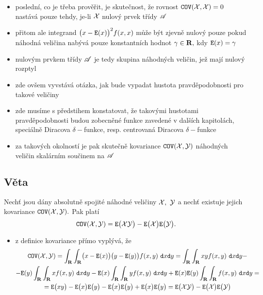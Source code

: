 \begin{itemize}
\item posledn\'i, co je t\v reba prov\v e\v rit, je skute\v cnost, \v ze rovnost $ \mathtt{COV}({\mathcal X},{\mathcal X})=0$ nast\'av\'a pouze tehdy, je-li ${\mathcal X}$ nulov\'y prvek t\v r\'idy ${\mathscr A}$
\item p\v ritom ale integrand $\bigl(x-\mathtt{E}(x)\bigr)^2f(x,x)$ m\r u\v ze b\'yt zjevn\v e nulov\'y pouze pokud n\'ahodn\'a veli\v cina nab\'yv\'a pouze konstantn\'ich hodnot $\gamma\in{\mathbf R},$ kdy $\mathtt{E}(x)=\gamma$
\item nulov\'ym prvkem t\v r\'idy ${\mathscr A}$ je tedy skupina n\'ahodn\'ych veli\v cin, je\v z maj\'i nulov\'y rozptyl
\item zde ov\v sem vyvst\'av\'a ot\'azka, jak bude vypadat hustota pravd\v epodobnosti pro takov\'e veli\v ciny
\item zde mus\'ime s p\v redstihem konstatovat, \v ze takov\'ymi hustotami pravd\v epodobnosti budou zobecn\v en\'e funkce zaveden\'e v dal\v s\'ich kapitol\'ach, speci\'aln\v e Diracova $\delta-$funkce, resp. centrovan\'a Diracova $\delta-$funkce
\item za takov\'ych okolnost\'i je pak skute\v cn\v e kovariance $\mathtt{COV}({\mathcal X},{\mathcal Y})$ n\'ahodn\'ych veli\v cin skal\'arn\'im sou\v cinem na ${\mathscr A}$


\end{itemize}



\subsection{V\v eta}\label{turner}

Nech\v t jsou d\'any absolutn\v e spojit\'e n\'ahodn\'e veli\v ciny ${\mathcal X}, ~{\mathcal Y}$ a nech\v t existuje jejich kovariance $\mathtt{COV}({\mathcal X},{\mathcal Y}).$ Pak plat\'i
%
$$\mathtt{COV}({\mathcal X},{\mathcal Y}) = \mathtt{E}\bigl({\mathcal X}{\mathcal Y}\bigr)-\mathtt{E}\bigl({\mathcal X}\bigr)\mathtt{E}\bigl({\mathcal Y}\bigr).$$

\Proof

\begin{itemize}
\item z definice kovariance p\v r\'imo vypl\'yv\'a, \v ze
%
\begin{multline*}
 \mathtt{COV}({\mathcal X},{\mathcal Y}) = \int_{\mathbf R} \int_{\mathbf R} \bigl(x-\mathtt{E}(x)\bigr)\bigl(y-\mathtt{E}(y)\bigr)f(x,y)~\mathtt{d}x\mathtt{d}y = \int_{\mathbf R}\int_{\mathbf R} xyf(x,y)~\mathtt{d}x\mathtt{d}y {}-\\
  - \mathtt{E}(y) \int_{\mathbf R}\int_{\mathbf R} xf(x,y)~\mathtt{d}x\mathtt{d}y - \mathtt{E}(x) \int_{\mathbf R}\int_{\mathbf R} yf(x,y)~\mathtt{d}x\mathtt{d}y  + \mathtt{E}(x)\mathtt{E}(y) \int_{\mathbf R}\int_{\mathbf R} f(x,y)~\mathtt{d}x\mathtt{d}y {}=\\
  = \mathtt{E}\bigl(xy\bigr) - \mathtt{E}\bigl(x\bigr)\mathtt{E}\bigl(y\bigr) - \mathtt{E}\bigl(x\bigr)\mathtt{E}\bigl(y\bigr) + \mathtt{E}\bigl(x\bigr)\mathtt{E}\bigl(y\bigr) = \mathtt{E}\bigl({\mathcal X}{\mathcal Y}\bigr)-\mathtt{E}\bigl({\mathcal X}\bigr)\mathtt{E}\bigl({\mathcal Y}\bigr)
\end{multline*}
%
\end{itemize}


